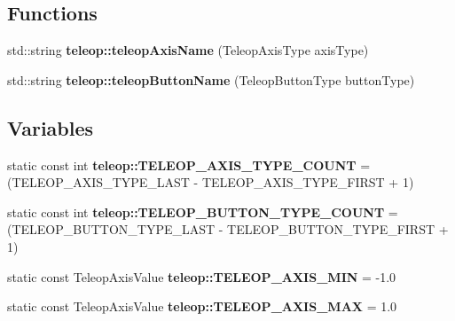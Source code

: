 \subsection*{Functions}
\begin{DoxyCompactItemize}
\item 
std::string {\bf teleop::teleopAxisName} (TeleopAxisType axisType)
\item 
std::string {\bf teleop::teleopButtonName} (TeleopButtonType buttonType)
\end{DoxyCompactItemize}
\subsection*{Variables}
\begin{DoxyCompactItemize}
\item 
static const int {\bf teleop::TELEOP\_\-AXIS\_\-TYPE\_\-COUNT} = (TELEOP\_\-AXIS\_\-TYPE\_\-LAST -\/ TELEOP\_\-AXIS\_\-TYPE\_\-FIRST + 1)
\item 
static const int {\bf teleop::TELEOP\_\-BUTTON\_\-TYPE\_\-COUNT} = (TELEOP\_\-BUTTON\_\-TYPE\_\-LAST -\/ TELEOP\_\-BUTTON\_\-TYPE\_\-FIRST + 1)
\end{DoxyCompactItemize}
{\bf }\par
\begin{DoxyCompactItemize}
\item 
static const TeleopAxisValue {\bf teleop::TELEOP\_\-AXIS\_\-MIN} = -\/1.0
\item 
static const TeleopAxisValue {\bf teleop::TELEOP\_\-AXIS\_\-MAX} = 1.0
\end{DoxyCompactItemize}

